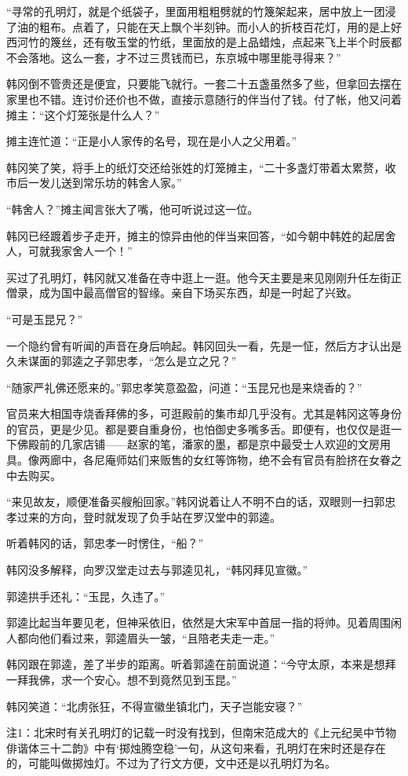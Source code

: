 “寻常的孔明灯，就是个纸袋子，里面用粗粗劈就的竹篾架起来，居中放上一团浸了油的粗布。点着了，只能在天上飘个半刻钟。而小人的折枝百花灯，用的是上好西河竹的篾丝，还有敬玉堂的竹纸，里面放的是上品蜡烛，点起来飞上半个时辰都不会落地。这么一套，才不过三贯钱而已，东京城中哪里能寻得来？”

韩冈倒不管贵还是便宜，只要能飞就行。一套二十五盏虽然多了些，但拿回去摆在家里也不错。连讨价还价也不做，直接示意随行的伴当付了钱。付了帐，他又问着摊主：“这个灯笼张是什么人？”

摊主连忙道：“正是小人家传的名号，现在是小人之父用着。”

韩冈笑了笑，将手上的纸灯交还给张姓的灯笼摊主，“二十多盏灯带着太累赘，收市后一发儿送到常乐坊的韩舍人家。”

“韩舍人？”摊主闻言张大了嘴，他可听说过这一位。

韩冈已经踱着步子走开，摊主的惊异由他的伴当来回答，“如今朝中韩姓的起居舍人，可就我家舍人一个！”

买过了孔明灯，韩冈就又准备在寺中逛上一逛。他今天主要是来见刚刚升任左街正僧录，成为国中最高僧官的智缘。亲自下场买东西，却是一时起了兴致。

“可是玉昆兄？”

一个隐约曾有听闻的声音在身后响起。韩冈回头一看，先是一怔，然后方才认出是久未谋面的郭逵之子郭忠孝，“怎么是立之兄？”

“随家严礼佛还愿来的。”郭忠孝笑意盈盈，问道：“玉昆兄也是来烧香的？”

官员来大相国寺烧香拜佛的多，可逛殿前的集市却几乎没有。尤其是韩冈这等身份的官员，更是少见。都是要自重身份，也怕御史多嘴多舌。即便有，也仅仅是逛一下佛殿前的几家店铺——赵家的笔，潘家的墨，都是京中最受士人欢迎的文房用具。像两廊中，各尼庵师姑们来贩售的女红等饰物，绝不会有官员有脸挤在女眷之中去购买。

“来见故友，顺便准备买艘船回家。”韩冈说着让人不明不白的话，双眼则一扫郭忠孝过来的方向，登时就发现了负手站在罗汉堂中的郭逵。

听着韩冈的话，郭忠孝一时愣住，“船？”

韩冈没多解释，向罗汉堂走过去与郭逵见礼，“韩冈拜见宣徽。”

郭逵拱手还礼：“玉昆，久违了。”

郭逵比起当年要见老，但神采依旧，依然是大宋军中首屈一指的将帅。见着周围闲人都向他们看过来，郭逵眉头一皱，“且陪老夫走一走。”

韩冈跟在郭逵，差了半步的距离。听着郭逵在前面说道：“今守太原，本来是想拜一拜我佛，求一个安心。想不到竟然见到玉昆。”

韩冈笑道：“北虏张狂，不得宣徽坐镇北门，天子岂能安寝？”

注1：北宋时有关孔明灯的记载一时没有找到，但南宋范成大的《上元纪吴中节物俳谐体三十二韵》中有‘掷烛腾空稳’一句，从这句来看，孔明灯在宋时还是存在的，可能叫做掷烛灯。不过为了行文方便，文中还是以孔明灯为名。

